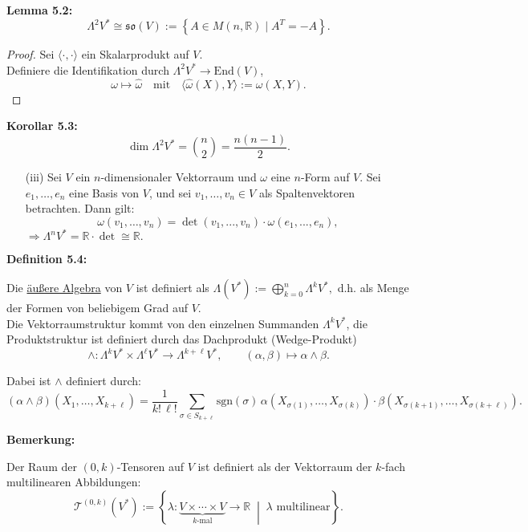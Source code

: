 \documentclass[fleqn, 12pt, letterpaper]{article}
\begin{document}
\textbf{Lemma 5.2:}
\[
\Lambda^2 V^* \cong \mathfrak{so}(V) := \left\{ A \in  M(n,\mathbb{R}) \mid A^T = -A \right\}.
\]

\begin{proof}
Sei \( \langle \cdot, \cdot \rangle \) ein Skalarprodukt auf \( V \).\\
Definiere die Identifikation durch \( \Lambda^2 V^* \to \mathrm{End}(V) \), 
\[
\omega \mapsto \hat{\omega} \quad \text{mit} \quad \langle \hat{\omega}(X), Y \rangle := \omega(X, Y).
\]
\end{proof}

\textbf{Korollar 5.3:}
\[
\dim \Lambda^2 V^* = \binom{n}{2} =\frac{n(n-1)}{2}.
\]

\begin{itemize}
  \item[(iii)] Sei \( V \) ein \( n \)-dimensionaler Vektorraum und \( \omega \) eine \( n \)-Form auf \( V \). Sei \( e_1, \dots, e_n \) eine Basis von \( V \), und sei \( v_1, \dots, v_n \in V \) als Spaltenvektoren betrachten. Dann gilt:
  \[
  \omega(v_1, \dots, v_n) = \det(v_1,...,v_n)\cdot\omega(e_1,...,e_n),
  \]
   \(\Rightarrow \Lambda^n V^* = \mathbb{R} \cdot \det \cong \mathbb{R}. \)
\end{itemize}

\textbf{Definition 5.4:}

Die \underline{äußere Algebra} von \( V \) ist definiert als
\(
\Lambda(V^*) := \bigoplus_{k=0}^n \Lambda^k V^*,
\)
d.h. als Menge der Formen von beliebigem Grad auf \( V \). \\

Die Vektorraumstruktur kommt von den einzelnen Summanden \( \Lambda^k V^* \),
die Produktstruktur ist definiert durch das Dachprodukt (Wedge-Produkt)
\[
\wedge \colon \Lambda^k V^* \times \Lambda^\ell V^* \longrightarrow \Lambda^{k+\ell} V^*,
\qquad (\alpha, \beta) \mapsto \alpha \wedge \beta.
\]

Dabei ist \( \wedge \) definiert durch:
\[
(\alpha \wedge \beta)(X_1, \dots, X_{k+\ell}) = \frac{1}{k! \, \ell!} \sum_{\sigma \in S_{k+\ell}} \mathrm{sgn}(\sigma)\,
\alpha(X_{\sigma(1)}, \dots, X_{\sigma(k)}) \cdot
\beta(X_{\sigma(k+1)}, \dots, X_{\sigma(k+\ell)}).
\]

\textbf{Bemerkung:}

Der Raum der \((0,k)\)-Tensoren auf \( V \) ist definiert als der Vektorraum der \( k \)-fach multilinearen Abbildungen:
\[
\mathcal{T}^{(0,k)}(V^*) := \left\{ \lambda \colon \underbrace{V \times \cdots \times V}_{k\text{-mal}} \to \mathbb{R} \;\middle|\; \lambda \text{ multilinear} \right\}.
\]
\end{document}
